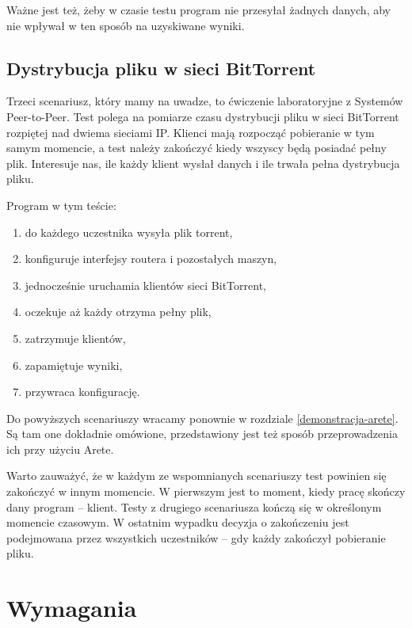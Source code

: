 \documentclass[00-praca-magisterska.tex]{subfiles}
\begin{document}
Ważne jest też, żeby w czasie testu program nie przesyłał żadnych danych, aby
nie wpływał w ten sposób na uzyskiwane wyniki.

\subsection{Dystrybucja pliku w sieci BitTorrent}

Trzeci scenariusz, który mamy na uwadze, to ćwiczenie laboratoryjne z Systemów
Peer\--to\--Peer. Test polega na pomiarze czasu dystrybucji pliku w sieci
BitTorrent rozpiętej nad dwiema sieciami IP. Klienci mają rozpocząć pobieranie
w tym samym momencie, a test należy zakończyć kiedy wszyscy będą posiadać pełny
plik. Interesuje nas, ile każdy klient wysłał danych i ile trwała pełna
dystrybucja pliku.

Program w tym teście:
\begin{enumerate}
\item do każdego uczestnika wysyła plik torrent,
\item konfiguruje interfejsy routera i pozostałych maszyn,
\item jednocześnie uruchamia klientów sieci BitTorrent,
\item oczekuje aż każdy otrzyma pełny plik,
\item zatrzymuje klientów,
\item zapamiętuje wyniki,
\item przywraca konfigurację.
\end{enumerate}

Do powyższych scenariuszy wracamy ponownie w rozdziale \ref{demonstracja-arete}. Są
tam one dokładnie omówione, przedstawiony jest też sposób przeprowadzenia ich
przy użyciu Arete.

Warto zauważyć, że w każdym ze wspomnianych scenariuszy test powinien się
zakończyć w innym momencie. W pierwszym jest to moment, kiedy pracę skończy
dany program -- klient. Testy z drugiego scenariusza kończą się w określonym momencie
czasowym. W ostatnim wypadku decyzja o zakończeniu jest podejmowana przez
wszystkich uczestników -- gdy każdy zakończył pobieranie pliku.

\section{Wymagania}
\label{arete-wymagania}
\end{document}
